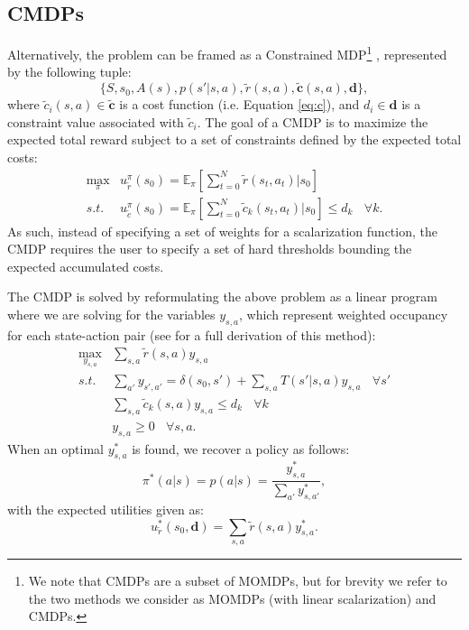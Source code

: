 \documentclass[letterpaper, 10 pt, conference]{ieeeconf}  %
\begin{document}
\subsection{CMDPs}
Alternatively, the problem can be framed as a Constrained MDP\footnote{We note that CMDPs are a subset of MOMDPs, but for brevity we refer to the two methods we consider as MOMDPs (with linear scalarization) and CMDPs.} \cite{altman1999constrained}, represented by the following tuple:
\begin{equation}
\{S, s_0, A(s), p(s'|s,a), \tilde{r}(s,a), \tilde{\mathbf{c}}(s,a), \mathbf{d}\},
\end{equation}
where $\tilde{c}_i(s,a) \in \tilde{\mathbf{c}}$ is a cost function (i.e. Equation \ref{eq:c}), and $d_i \in \mathbf{d}$ is a constraint value associated with $\tilde{c}_i$.  The goal of a CMDP is to maximize the expected total reward subject to a set of constraints defined by the expected total costs:
\begin{equation}
\begin{split}
\max_{\pi}{} & u^\pi_{\tilde{r}}(s_0)= \mathbb{E}_{\pi}\left[\sum_{t=0}^{N}\tilde{r}(s_t,a_t)|s_0\right] \\
s.t.\, & u_{\tilde{c}}^\pi(s_0) = \mathbb{E}_\pi\left[\sum_{t=0}^N{\tilde{c}_k(s_t,a_t)|s_0}\right] \leq d_k \:\:\:\: \forall k.
\end{split}
\end{equation}
As such, instead of specifying a set of weights for a scalarization function, the CMDP requires the user to specify a set of hard thresholds bounding the expected accumulated costs.  

The CMDP is solved by reformulating the above problem as a linear program where we are solving for the variables $y_{s,a}$, which represent weighted occupancy for each state-action pair (see \cite{altman1999constrained} for a full derivation of this method):
\begin{equation}
\begin{split}
\max_{y_{s,a}}{} & {\sum_{s,a}{\tilde{r}(s,a)y_{s,a}}}\\
s.t.  & \sum_{a'}{y_{s',a'}}=\delta(s_0,s')+\sum_{s,a}{T(s'|s,a)y_{s,a}} \:\:\:\: \forall s'\\
& \sum_{s,a}{\tilde{c}_k(s,a)y_{s,a}} \leq d_k \:\:\:\: \forall k\\
& y_{s,a} \geq 0 \:\:\:\: \forall s,a.
\end{split}
\end{equation}
When an optimal $y^*_{s,a}$ is found, we recover a policy as follows:
\begin{equation}
\pi^*(a|s)=p(a|s)=\frac{y^*_{s,a}}{\sum_{a'}{y^*_{s,a'}}},
\label{eq:lp}
\end{equation}
with the expected utilities given as:
\begin{equation}
u^*_{\tilde{r}}(s_0,\mathbf{d}) = \sum_{s,a}{\tilde{r}(s,a)y^*_{s,a}}.
\end{equation}
\end{document}
